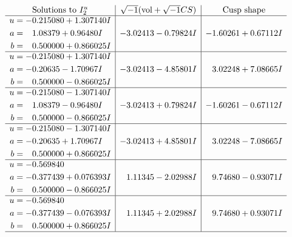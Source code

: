 \documentclass[1p]{elsarticle_modified}
\theoremstyle{definition}
\newcommand{\I}{\sqrt{-1}}
\begin{document}
$$\begin{array}{c|c|c}  
\text{Solutions to }I^u_{2}& \I (\text{vol} + \sqrt{-1}CS) & \text{Cusp shape}\\
 \hline 
\begin{aligned}
u &= -0.215080 + 1.307140 I \\
a &= \phantom{-}1.08379 + 0.96480 I \\
b &= \phantom{-}0.500000 + 0.866025 I\end{aligned}
 & -3.02413 - 0.79824 I & -1.60261 + 0.67112 I \\ \hline\begin{aligned}
u &= -0.215080 + 1.307140 I \\
a &= -0.20635 - 1.70967 I \\
b &= \phantom{-}0.500000 - 0.866025 I\end{aligned}
 & -3.02413 - 4.85801 I & \phantom{-}3.02248 + 7.08665 I \\ \hline\begin{aligned}
u &= -0.215080 - 1.307140 I \\
a &= \phantom{-}1.08379 - 0.96480 I \\
b &= \phantom{-}0.500000 - 0.866025 I\end{aligned}
 & -3.02413 + 0.79824 I & -1.60261 - 0.67112 I \\ \hline\begin{aligned}
u &= -0.215080 - 1.307140 I \\
a &= -0.20635 + 1.70967 I \\
b &= \phantom{-}0.500000 + 0.866025 I\end{aligned}
 & -3.02413 + 4.85801 I & \phantom{-}3.02248 - 7.08665 I \\ \hline\begin{aligned}
u &= -0.569840\phantom{ +0.000000I} \\
a &= -0.377439 + 0.076393 I \\
b &= \phantom{-}0.500000 - 0.866025 I\end{aligned}
 & \phantom{-}1.11345 - 2.02988 I & \phantom{-}9.74680 - 0.93071 I \\ \hline\begin{aligned}
u &= -0.569840\phantom{ +0.000000I} \\
a &= -0.377439 - 0.076393 I \\
b &= \phantom{-}0.500000 + 0.866025 I\end{aligned}
 & \phantom{-}1.11345 + 2.02988 I & \phantom{-}9.74680 + 0.93071 I\\
 \hline 
 \end{array}$$\newpage
\end{document}
